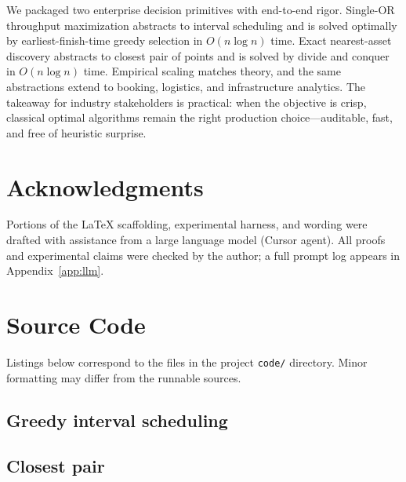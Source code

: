 \documentclass[sigconf,review=false]{acmart}
\theoremstyle{definition}
\begin{document}
We packaged two enterprise decision primitives with end-to-end rigor.
Single-OR throughput maximization abstracts to interval scheduling and is
solved optimally by earliest-finish-time greedy selection in $O(n\log n)$
time. Exact nearest-asset discovery abstracts to closest pair of points and
is solved by divide and conquer in $O(n\log n)$ time. Empirical scaling
matches theory, and the same abstractions extend to booking, logistics, and
infrastructure analytics. The takeaway for industry stakeholders is
practical: when the objective is crisp, classical optimal algorithms remain
the right production choice---auditable, fast, and free of heuristic
surprise.

\section*{Acknowledgments}

Portions of the \LaTeX{} scaffolding, experimental harness, and wording were
drafted with assistance from a large language model (Cursor agent). All
proofs and experimental claims were checked by the author; a full prompt
log appears in Appendix~\ref{app:llm}.




\appendix

\section{Source Code}
\label{app:code}

Listings below correspond to the files in the project \texttt{code/}
directory. Minor formatting may differ from the runnable sources.

\subsection{Greedy interval scheduling}


\subsection{Closest pair}

\end{document}
